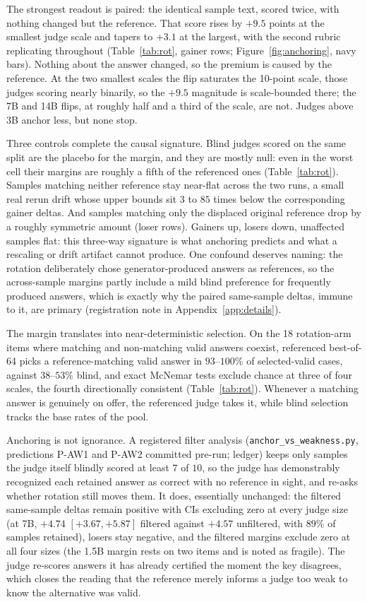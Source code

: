 \documentclass[11pt]{article}
\begin{document}
The strongest readout is paired: the identical sample text, scored twice, with nothing changed but the reference.
That score rises by $+9.5$ points at the smallest judge scale and tapers to $+3.1$ at the largest, with the second rubric replicating throughout (Table~\ref{tab:rot}, gainer rows; Figure~\ref{fig:anchoring}, navy bars).
Nothing about the answer changed, so the premium is caused by the reference.
At the two smallest scales the flip saturates the 10-point scale, those judges scoring nearly binarily, so the $+9.5$ magnitude is scale-bounded there; the 7B and 14B flips, at roughly half and a third of the scale, are not.
Judges above 3B anchor less, but none stop.

Three controls complete the causal signature.
Blind judges scored on the same split are the placebo for the margin, and they are mostly null: even in the worst cell their margins are roughly a fifth of the referenced ones (Table~\ref{tab:rot}).
Samples matching neither reference stay near-flat across the two runs, a small real rerun drift whose upper bounds sit $3$ to $85$ times below the corresponding gainer deltas.
And samples matching only the displaced original reference drop by a roughly symmetric amount (loser rows).
Gainers up, losers down, unaffected samples flat: this three-way signature is what anchoring predicts and what a rescaling or drift artifact cannot produce.
One confound deserves naming: the rotation deliberately chose generator-produced answers as references, so the across-sample margins partly include a mild blind preference for frequently produced answers, which is exactly why the paired same-sample deltas, immune to it, are primary (registration note in Appendix~\ref{app:details}).

The margin translates into near-deterministic selection.
On the 18 rotation-arm items where matching and non-matching valid answers coexist, referenced best-of-64 picks a reference-matching valid answer in $93$--$100\%$ of selected-valid cases, against $38$--$53\%$ blind, and exact McNemar tests exclude chance at three of four scales, the fourth directionally consistent (Table~\ref{tab:rot}).
Whenever a matching answer is genuinely on offer, the referenced judge takes it, while blind selection tracks the base rates of the pool.

Anchoring is not ignorance.
A registered filter analysis (\texttt{anchor\_vs\_weakness.py}, predictions P-AW1 and P-AW2 committed pre-run; ledger) keeps only samples the judge itself blindly scored at least $7$ of $10$, so the judge has demonstrably recognized each retained answer as correct with no reference in sight, and re-asks whether rotation still moves them.
It does, essentially unchanged: the filtered same-sample deltas remain positive with CIs excluding zero at every judge size (at 7B, $+4.74$ $[+3.67, +5.87]$ filtered against $+4.57$ unfiltered, with $89\%$ of samples retained), losers stay negative, and the filtered margins exclude zero at all four sizes (the 1.5B margin rests on two items and is noted as fragile).
The judge re-scores answers it has already certified the moment the key disagrees, which closes the reading that the reference merely informs a judge too weak to know the alternative was valid.
\end{document}

